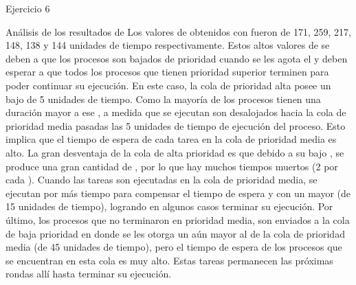 
\begin{section}{Ejercicio 6}

\begin{subsection}{Análisis de los resultados de }
	Los valores de  obtenidos con  fueron de 171, 259, 217, 148, 138 y 144 unidades de tiempo respectivamente. Estos altos valores de  se deben a que los procesos son bajados de prioridad cuando se les agota el  y deben esperar a que todos los procesos que tienen prioridad superior terminen para poder continuar su ejecución. En este caso, la cola de prioridad alta posee un  bajo de 5 unidades de tiempo. Como la mayoría de los procesos tienen una duración mayor a ese , a medida que se ejecutan son desalojados hacia la cola de prioridad media pasadas las 5 unidades de tiempo de ejecución del proceso. Esto implica que el tiempo de espera de cada tarea en la cola de prioridad media es alto. La gran desventaja de la cola de alta prioridad es que debido a su bajo , se produce una gran cantidad de , por lo que hay muchos tiempos muertos (2 por cada ). Cuando las tareas son ejecutadas en la cola de prioridad media, se ejecutan por más tiempo para compensar el tiempo de espera y con un  mayor (de 15 unidades de tiempo), logrando en algunos casos terminar su ejecución. Por último, los procesos que no terminaron en prioridad media, son enviados a la cola de baja prioridad en donde se les otorga un  aún mayor al de la cola de prioridad media (de 45 unidades de tiempo), pero el tiempo de espera de los procesos que se encuentran en esta cola es muy alto. Estas tareas permanecen las próximas rondas allí hasta terminar su ejecución.
\end{subsection}

\end{section}

